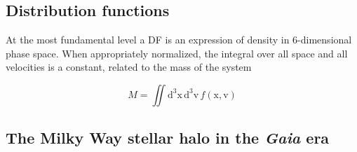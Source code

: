 \subsection{Distribution functions}

At the most fundamental level a DF is an expression of density in 6-dimensional phase space. When appropriately normalized, the integral over all space and all velocities is a constant, related to the mass of the system

\begin{equation}
    M = \iint \mathrm{d}^3\mathbf{\mathrm{x}}\, \mathrm{d}^3\mathbf{\mathrm{v}}\, f( \mathbf{\mathrm{x}}, \mathbf{\mathrm{v}} )
\end{equation}



\subsection{The Milky Way stellar halo in the \textit{Gaia} era}